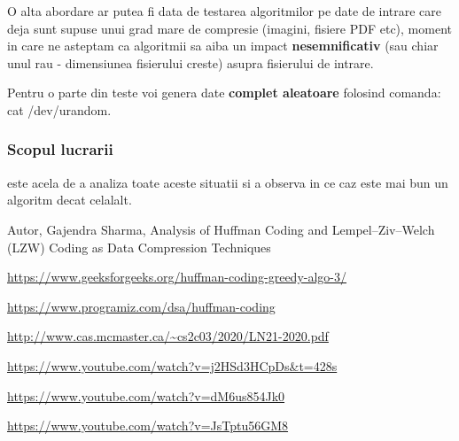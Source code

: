 \documentclass[runningheads]{llncs}
\begin{document}
O alta abordare ar putea fi data de testarea algoritmilor pe date de intrare care deja sunt
supuse unui grad mare de compresie (imagini, fisiere PDF etc), moment in care ne asteptam ca
algoritmii sa aiba un impact \textbf{nesemnificativ} (sau chiar unul rau - dimensiunea fisierului creste)
asupra fisierului de intrare.

Pentru o parte din teste voi genera date \textbf{complet aleatoare} folosind comanda:
cat /dev/urandom.

\subsubsection{Scopul lucrarii} este acela de a analiza toate aceste situatii si a observa
in ce caz este mai bun un algoritm decat celalalt.



\begin{thebibliography}{8}
Autor, Gajendra Sharma, Analysis of Huffman Coding and Lempel–Ziv–Welch (LZW) Coding as
Data Compression Techniques\textbf{}

\url{https://www.geeksforgeeks.org/huffman-coding-greedy-algo-3/}

\url{https://www.programiz.com/dsa/huffman-coding}

\url{http://www.cas.mcmaster.ca/~cs2c03/2020/LN21-2020.pdf}

\url{https://www.youtube.com/watch?v=j2HSd3HCpDs\&t=428s}

\url{https://www.youtube.com/watch?v=dM6us854Jk0}

\url{https://www.youtube.com/watch?v=JsTptu56GM8}

\end{thebibliography}
\end{document}

